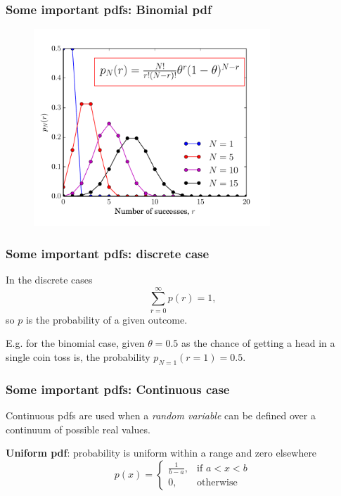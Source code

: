 \begin{frame}

\frametitle{Some important pdfs: Binomial pdf}
\label{someimportantpdfs:binomialpdf}

\begin{figure}[htbp]
\centering
\includegraphics[keepaspectratio,width=\textwidth,height=210pt]{figures/binomial.pdf}
\label{binomial}
\end{figure}

\end{frame}

\begin{frame}

\frametitle{Some important pdfs: discrete case}
\label{someimportantpdfs:discretecase}

In the discrete cases
\[
\sum_{r=0}^{\infty} p(r) = 1,
\]
so $p$ is the probability of a given outcome.

E.g. for the binomial case, given $\theta = 0.5$ as the chance of getting a head in a single coin
toss is, the probability $p_{N=1}(r=1) = 0.5$.

\end{frame}

\begin{frame}

\frametitle{Some important pdfs: Continuous case}
\label{someimportantpdfs:continuouscase}

Continuous pdfs are used when a \emph{random variable} can be defined over a continuum of possible real
values.

\textbf{Uniform pdf}: probability is uniform within a range and zero elsewhere
\[
p(x) =
  \begin{cases}
    \frac{1}{b-a},& \text{if } a < x < b \\
    0,              & \text{otherwise}
  \end{cases}
\]

\end{frame}

